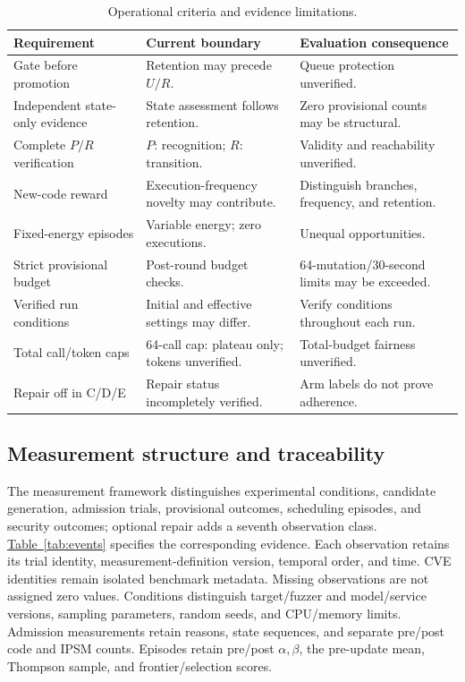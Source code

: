 \documentclass[final,5p,times,number]{elsarticle}
\newcommand{\namedref}[2]{\hyperref[#2]{#1~\ref*{#2}}}
\begin{document}
\begin{table}[!tbp]
\centering\small
\caption{Operational criteria and evidence limitations.}
\label{tab:implementation}
\begin{tabularx}{\textwidth}{Y Y Y}
\toprule
Requirement & Current boundary & Evaluation consequence \\
\midrule
Gate before promotion & Retention may precede $U/R$. & Queue protection unverified. \\
Independent state-only evidence & State assessment follows retention. & Zero provisional counts may be structural. \\
Complete $P/R$ verification & $P$: recognition; $R$: transition. & Validity and reachability unverified. \\
New-code reward & Execution-frequency novelty may contribute. & Distinguish branches, frequency, and retention. \\
Fixed-energy episodes & Variable energy; zero executions. & Unequal opportunities. \\
Strict provisional budget & Post-round budget checks. & 64-mutation/30-second limits may be exceeded. \\
Verified run conditions & Initial and effective settings may differ. & Verify conditions throughout each run. \\
Total call/token caps & 64-call cap: plateau only; tokens unverified. & Total-budget fairness unverified. \\
Repair off in C/D/E & Repair status incompletely verified. & Arm labels do not prove adherence. \\
\bottomrule
\end{tabularx}
\end{table}

\subsection{Measurement structure and traceability}
The measurement framework distinguishes experimental conditions, candidate generation, admission trials, provisional outcomes, scheduling episodes, and security outcomes; optional repair adds a seventh observation class. \namedref{Table}{tab:events} specifies the corresponding evidence. Each observation retains its trial identity, measurement-definition version, temporal order, and time. CVE identities remain isolated benchmark metadata. Missing observations are not assigned zero values. Conditions distinguish target/fuzzer and model/service versions, sampling parameters, random seeds, and CPU/memory limits. Admission measurements retain reasons, state sequences, and separate pre/post code and IPSM counts. Episodes retain pre/post $\alpha,\beta$, the pre-update mean, Thompson sample, and frontier/selection scores.
\end{document}

